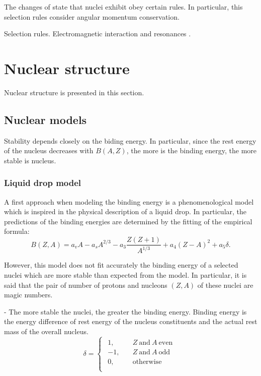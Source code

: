 \documentclass[openany]{book}
\begin{document}
The changes of state that nuclei exhibit obey certain rules. In particular, this selection rules consider angular momentum conservation. 



Selection rules. Electromagnetic interaction and resonances \cite{sasaki_kawano_stetcu_2022}.

\section{Nuclear structure} \label{sec:nuclearStructure}

Nuclear structure is presented in this section.

\subsection{Nuclear models}

Stability depends closely on the biding energy. In particular, since the rest energy of the nucleus decreases with $B(A, Z)$, the more is the binding energy, the more stable is nucleus.

\subsubsection{Liquid drop model}

A first approach when modeling the binding energy is a phenomenological model which is inspired in the physical description of a liquid drop. In particular, the predictions of the binding energies are determined by the fitting of the empirical formula: \\ 

\begin{equation}
	B(Z,A )= a_vA - a_sA^{2/3} - a_3 \frac{Z(Z+1)}{A^{1/3}} +  a_4(Z-A)^2 +   a_5 \delta.
\end{equation}


However, this model does not fit accurately the binding energy of a selected nuclei which are more stable than expected from the model. In particular, it is said that the pair of number of protons and nucleons $(Z, A)$ of these nuclei are magic numbers. 


-	The more stable the nuclei, the greater the binding energy.
Binding energy is the energy difference of rest energy of the nucleus constituents and the actual  rest mass of the overall nucleus. \\


\begin{equation}
	\delta = 	\left\{\begin{array}{l}
		\begin{split}
			1, \quad & Z \ \mathrm{and} \ A \  \mathrm{even} \\ 
			-1, \quad &  Z \ \mathrm{and} \ A \  \mathrm{odd} 	\\
			0, \quad & \mathrm{otherwise}	\\
		\end{split}
	\end{array}\right.
\end{equation}
\end{document}
